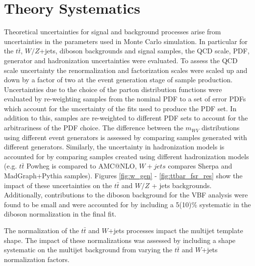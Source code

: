 \section{Theory Systematics}
Theoretical uncertainties for signal and background processes arise from uncertainties in the parameters used in Monte Carlo simulation. In particular for the $t\bar{t}$, $W/Z$+jets, diboson backgrounds and signal samples, the QCD scale, PDF, generator and hadronization uncertainties were evaluated. To assess the QCD scale uncertainty the renormalization and factorization scales were scaled up and down by a factor of two at the event generation stage of sample production. Uncertainties due to the choice of the parton distribution functions were evaluated by re-weighting samples from the nominal PDF to a set of error PDFs which account for the uncertainty of the fits used to produce the PDF set. In addition to this, samples are re-weighted to different PDF sets to account for the arbitrariness of the PDF choice. The difference between the $m_{WV}$ distributions using different event generators is assessed by comparing samples generated with different generators. Similarly, the uncertainty in hadronization models is accounted for by comparing samples created using different hadronization models (e.g. $t\bar{t}$ Powheg is compared to AMC@NLO, $W+jets$ compares Sherpa and MadGraph+Pythia samples). Figures \ref{fig:w_gen} - \ref{fig:ttbar_fsr_res} show the impact of these uncertainties on the $t\bar{t}$ and $W/Z$ + jets backgrounds. Additionally, contributions to the diboson background for the VBF analysis were found to be small and were accounted for by including a 5(10)\% systematic in the diboson normalization in the final fit.

The normalization of the $t\bar{t}$ and $W$+jets processes impact the multijet template shape. The impact of these normalizations was assessed by including a shape systematic on the multijet background from varying the $t\bar{t}$ and $W$+jets normalization factors. 



